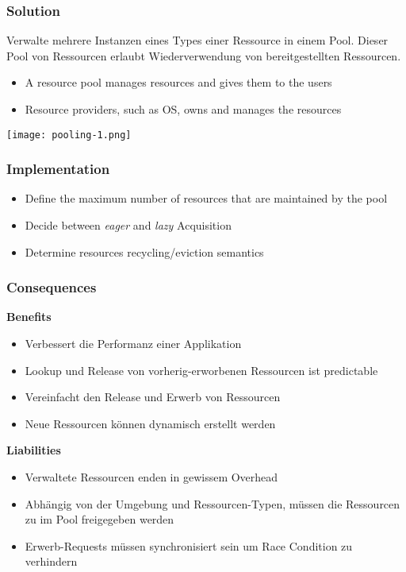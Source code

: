 \subsubsection{Solution}
Verwalte mehrere Instanzen eines Types einer Ressource in einem Pool. Dieser Pool von Ressourcen erlaubt Wiederverwendung von bereitgestellten Ressourcen.

\begin{itemize}
    \item A resource pool manages resources and gives them to the users
    \item Resource providers, such as OS, owns and manages the resources
\end{itemize}
\texttt{[image: pooling-1.png]}
\subsubsection{Implementation}
\begin{itemize}
    \item Define the maximum number of resources that are maintained by the pool
    \item Decide between \textit{eager} and \textit{lazy} Acquisition
    \item Determine resources recycling/eviction semantics
\end{itemize}

\subsubsection{Consequences}
\textbf{Benefits}
\begin{itemize}
    \item Verbessert die Performanz einer Applikation
    \item Lookup und Release von vorherig-erworbenen Ressourcen ist predictable
    \item Vereinfacht den Release und Erwerb von Ressourcen
    \item Neue Ressourcen können dynamisch erstellt werden
\end{itemize}
\vspace{10pt}
\textbf{Liabilities}
\begin{itemize}
    \item Verwaltete Ressourcen enden in gewissem Overhead
    \item Abhängig von der Umgebung und Ressourcen-Typen, müssen die Ressourcen zu im Pool freigegeben werden
    \item Erwerb-Requests müssen synchronisiert sein um Race Condition zu verhindern
\end{itemize}
